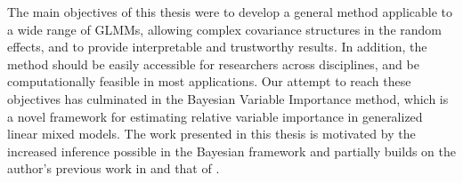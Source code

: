 The main objectives of this thesis were to develop a general method applicable to a wide range of GLMMs, allowing complex covariance structures in the random effects, and to provide interpretable and trustworthy results. In addition, the method should be easily accessible for researchers across disciplines, and be computationally feasible in most applications. Our attempt to reach these objectives has culminated in the Bayesian Variable Importance method, which is a novel framework for estimating relative variable importance in generalized linear mixed models. The work presented in this thesis is motivated by the increased inference possible in the Bayesian framework and partially builds on the author's previous work in \citet{Arnstad:Relative_variable_importance_in_Bayesian_linear_mixed_models:2024} and that of \citet{matre}.
\\
\\
